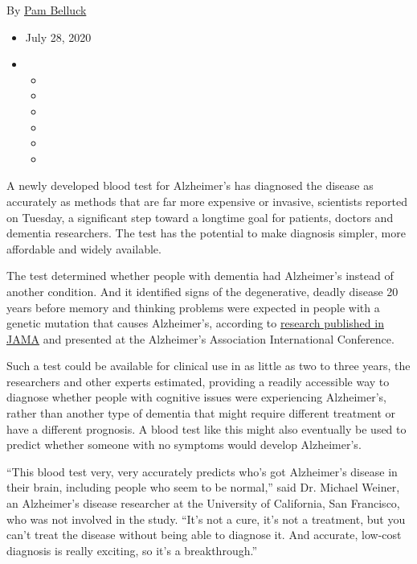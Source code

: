 By \href{https://www.nytimes.com/by/pam-belluck}{Pam Belluck}

\begin{itemize}
\item
  July 28, 2020
\item
  \begin{itemize}
  \item
  \item
  \item
  \item
  \item
  \item
  \end{itemize}
\end{itemize}

A newly developed blood test for Alzheimer's has diagnosed the disease
as accurately as methods that are far more expensive or invasive,
scientists reported on Tuesday, a significant step toward a longtime
goal for patients, doctors and dementia researchers. The test has the
potential to make diagnosis simpler, more affordable and widely
available.

The test determined whether people with dementia had Alzheimer's instead
of another condition. And it identified signs of the degenerative,
deadly disease 20 years before memory and thinking problems were
expected in people with a genetic mutation that causes Alzheimer's,
according to
\href{https://jamanetwork.com/journals/jama/fullarticle/10.1001/jama.2020.12134?guestAccessKey=42d098cb-7eca-4a1c-9d7b-9951b104b003\&utm_source=For_The_Media\&utm_medium=referral\&utm_campaign=ftm_links\&utm_content=tfl\&utm_term=072820}{research
published in JAMA} and presented at the Alzheimer's Association
International Conference.

Such a test could be available for clinical use in as little as two to
three years, the researchers and other experts estimated, providing a
readily accessible way to diagnose whether people with cognitive issues
were experiencing Alzheimer's, rather than another type of dementia that
might require different treatment or have a different prognosis. A blood
test like this might also eventually be used to predict whether someone
with no symptoms would develop Alzheimer's.

``This blood test very, very accurately predicts who's got Alzheimer's
disease in their brain, including people who seem to be normal,'' said
Dr. Michael Weiner, an Alzheimer's disease researcher at the University
of California, San Francisco, who was not involved in the study. ``It's
not a cure, it's not a treatment, but you can't treat the disease
without being able to diagnose it. And accurate, low-cost diagnosis is
really exciting, so it's a breakthrough.''

